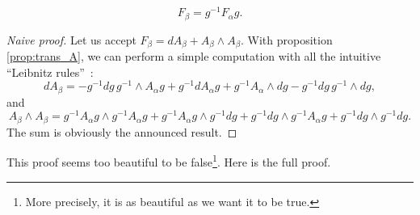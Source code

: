 \begin{theorem}
\begin{equation}
     F_{\beta}=g^{-1} F_{\alpha} g.
\end{equation}
\label{tho:trans_F}
\end{theorem}

\begin{proof}[Naive proof]
Let us accept $F_{\beta}=dA_{\beta}+A_{\beta}\wedge A_{\beta}$. With proposition \ref{prop:trans_A}, we can perform a simple computation with all the intuitive ``Leibnitz rules''\ :
\[
   dA_{\beta}=-g^{-1} dg\, g^{-1}\wedge A_{\alpha} g+g^{-1} dA_{\alpha} g+g^{-1} A_{\alpha}\wedge dg-g^{-1} dg\,g^{-1}\wedge dg,
\]
and
\[
  A_{\beta}\wedge A_{\beta}=g^{-1} A_{\alpha} g\wedge g^{-1} A_{\alpha} g+g^{-1} A_{\alpha} g\wedge g^{-1} dg+g^{-1} dg\wedge g^{-1} A_{\alpha} g+g^{-1} dg\wedge g^{-1} dg.
\]
The sum is obviously the announced result.
\end{proof}
This proof seems too beautiful to be false\footnote{More precisely, it is as beautiful as we want it to be true.}. Here is the full proof.

